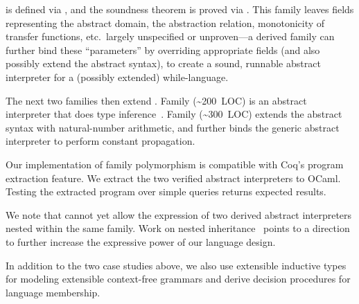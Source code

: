 \noindent
{} is defined via , and the soundness theorem
is proved via .
This family leaves fields representing the abstract domain, the
abstraction relation, monotonicity of transfer functions, etc.\ 
largely unspecified or unproven---a derived family can further bind
these ``parameters'' by overriding appropriate fields (and also possibly
extend the abstract syntax), to create a sound, runnable abstract
interpreter for a (possibly extended) while-language.

The next two families then extend .
Family  (\textasciitilde200~LOC) is an abstract
interpreter that does type inference~\cite{cousot1997types}.
Family  (\textasciitilde300~LOC) extends the abstract syntax
with natural-number arithmetic,
and further binds the generic abstract interpreter to perform constant propagation.
%

Our implementation of family polymorphism is compatible with Coq's
program extraction feature.
We extract the two verified abstract interpreters to OCaml.
Testing the extracted program over simple queries returns expected results.

We note that \Lang cannot yet allow the expression of two derived abstract
interpreters nested within the same family.
Work on nested inheritance~\cite{ncm2004,zm2017} points to a direction
to further increase the expressive power of our language design.


In addition to the two case studies above, we also use extensible
inductive types for modeling extensible context-free grammars and derive
decision procedures for language membership.

